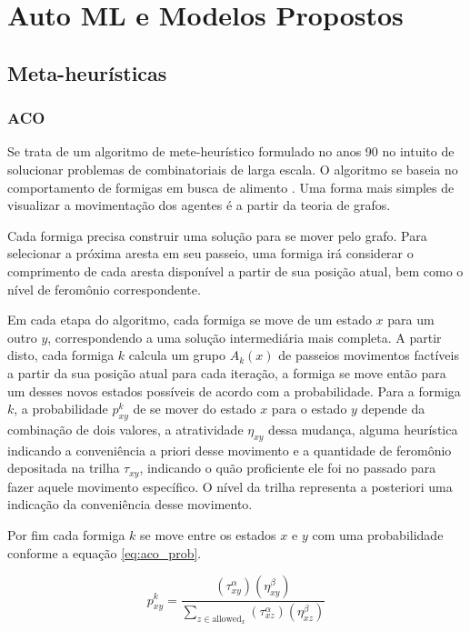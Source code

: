 \chapter{Auto ML e Modelos Propostos}
\label{cap:auto_ml}

\section{Meta-heurísticas}

\subsection{ACO}

Se trata de um algoritmo de mete-heurístico formulado no anos 90 \cite{dorigo1999ant} no intuito de solucionar problemas de combinatoriais de larga escala. O algoritmo se baseia no comportamento de formigas em busca de alimento \cite{dorigo2006ant}. Uma forma mais simples de visualizar a movimentação dos agentes é a partir da teoria de grafos.

Cada formiga precisa construir uma solução para se mover pelo grafo. Para selecionar a próxima aresta em seu passeio, uma formiga irá considerar o comprimento de cada aresta disponível a partir de sua posição atual, bem como o nível de feromônio correspondente.

Em cada etapa do algoritmo, cada formiga se move de um estado $\textit{x}$ para um outro $\textit{y}$, correspondendo a uma solução intermediária mais completa. A partir disto, cada formiga $k$ calcula um grupo $A_{k}(x)$ de passeios movimentos factíveis a partir da sua posição atual para cada iteração, a formiga se move então para um desses novos estados possíveis de acordo com a probabilidade. Para a formiga $k$, a probabilidade $p_{xy}^{k}$ de se mover do estado $x$ para o estado $y$ depende da combinação de dois valores, a atratividade $\eta _{xy}$ dessa mudança, alguma heurística indicando a conveniência a priori desse movimento e a quantidade de feromônio depositada na trilha $\tau _{xy}$, indicando o quão proficiente ele foi no passado para fazer aquele movimento específico. O nível da trilha representa a posteriori uma indicação da conveniência desse movimento.

Por fim cada formiga $k$ se move entre os estados $x$ e $y$ com uma probabilidade conforme a equação \ref{eq:aco_prob}.

\begin{equation}
\label{eq:aco_prob}
    p_{xy}^k =
    \frac
    { (\tau_{xy}^{\alpha}) (\eta_{xy}^{\beta}) }
    { \sum_{z\in \mathrm{allowed}_x} (\tau_{xz}^{\alpha}) (\eta_{xz}^{\beta}) }
\end{equation}


